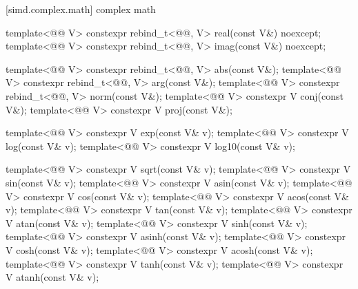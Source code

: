 [simd.complex.math]{ complex math}

\begin{itemdecl}
template<@@ V>
  constexpr rebind_t<@@, V> real(const V&) noexcept;
template<@@ V>
  constexpr rebind_t<@@, V> imag(const V&) noexcept;

template<@@ V>
  constexpr rebind_t<@@, V> abs(const V&);
template<@@ V>
  constexpr rebind_t<@@, V> arg(const V&);
template<@@ V>
  constexpr rebind_t<@@, V> norm(const V&);
template<@@ V> constexpr V conj(const V&);
template<@@ V> constexpr V proj(const V&);

template<@@ V> constexpr V exp(const V& v);
template<@@ V> constexpr V log(const V& v);
template<@@ V> constexpr V log10(const V& v);

template<@@ V> constexpr V sqrt(const V& v);
template<@@ V> constexpr V sin(const V& v);
template<@@ V> constexpr V asin(const V& v);
template<@@ V> constexpr V cos(const V& v);
template<@@ V> constexpr V acos(const V& v);
template<@@ V> constexpr V tan(const V& v);
template<@@ V> constexpr V atan(const V& v);
template<@@ V> constexpr V sinh(const V& v);
template<@@ V> constexpr V asinh(const V& v);
template<@@ V> constexpr V cosh(const V& v);
template<@@ V> constexpr V acosh(const V& v);
template<@@ V> constexpr V tanh(const V& v);
template<@@ V> constexpr V atanh(const V& v);
\end{itemdecl}

